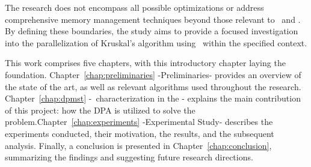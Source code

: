 The research does not encompass all possible optimizations or address comprehensive memory management techniques beyond those relevant to \Go\ and \dpm. By defining these boundaries, the study aims to provide a focused investigation into the parallelization of Kruskal's algorithm using \dpm\ within the specified context.


This work comprises five chapters, with this introductory chapter laying the foundation. Chapter~\ref{chap:preliminaries} -Preliminaries- provides an overview of the state of the art, as well as relevant algorithms used throughout the research. Chapter~\ref{chap:dpmst} -\mst\ characterization in the \dpm- explains the main contribution of this project: how the DPA is utilized to solve the \mst problem.Chapter~\ref{chap:experiments} -Experimental Study- describes the experiments conducted, their motivation, the results, and the subsequent analysis. Finally, a conclusion is presented in Chapter~\ref{chap:conclusion}, summarizing the findings and suggesting future research directions.
